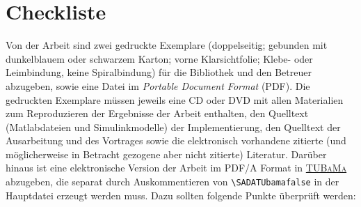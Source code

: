 \chapter{Checkliste}
\label{cha:Checkliste}

Von der Arbeit sind zwei gedruckte Exemplare (doppelseitig; gebunden mit dunkelblauem oder schwarzem Karton; vorne Klarsichtfolie; Klebe- oder Leimbindung, keine Spiralbindung) für die Bibliothek und den Betreuer abzugeben, sowie eine Datei im \emph{Portable Document Format} (PDF).
Die gedruckten Exemplare müssen jeweils eine CD oder DVD mit allen Materialien zum Reproduzieren der Ergebnisse der Arbeit enthalten, \dah den Quelltext (\bspw Matlabdateien und Simulinkmodelle) der Implementierung, den Quelltext der Ausarbeitung und des Vortrages sowie die elektronisch vorhandene zitierte (und möglicherweise in Betracht gezogene aber nicht zitierte) Literatur.
Darüber hinaus ist eine elektronische Version der Arbeit im PDF/A Format in \href{https://tubama.ulb.tu-darmstadt.de/}{\textsc{TUBaMa}} abzugeben, die separat durch Auskommentieren von \texttt{\textbackslash{}SADATUbamafalse} in der Hauptdatei erzeugt werden muss.
Dazu sollten folgende Punkte überprüft werden:


\renewcommand{\labelitemi}{%
  \setlength{\fboxsep}{.6ex}\raisebox{.7ex}{\framebox{}}}

